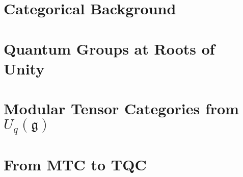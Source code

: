 \mediumspacing

\chapter{Categorical Background} 
\label{chap:categoricalbackground} 
\doublespacing


\mediumspacing

\chapter{Quantum Groups at Roots of Unity} 
\label{chap:uqsl2} 
\doublespacing


\mediumspacing


\chapter{Modular Tensor Categories from $U_q(\mathfrak{g})$} 
\label{chap:MTCfromuqsl2} 
\doublespacing


\mediumspacing

\chapter{From MTC to TQC} 
\label{chap:MTCtoTQC} 
\doublespacing


\mediumspacing


\clearpage
{}
\nocite{*}




%




